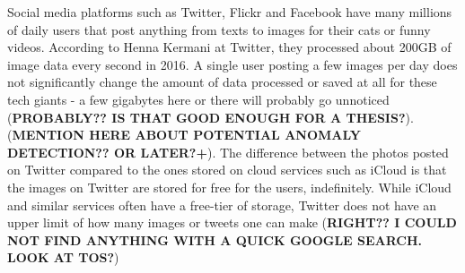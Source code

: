 Social media platforms such as Twitter, Flickr and Facebook have many millions of daily users that post anything from texts to images for their cats or funny videos. According to Henna Kermani at Twitter, they processed about 200GB of image data every second in 2016\cite{MobileScaleLondona}. A single user posting a few images per day does not significantly change the amount of data processed or saved at all for these tech giants - a few gigabytes here or there will probably go unnoticed (\textbf{PROBABLY?? IS THAT GOOD ENOUGH FOR A THESIS?}). (\textbf{MENTION HERE ABOUT POTENTIAL ANOMALY DETECTION?? OR LATER?+}). The difference between the photos posted on Twitter compared to the ones stored on cloud services such as iCloud is that the images on Twitter are stored for free for the users, indefinitely. While iCloud and similar services often have a free-tier of storage, Twitter does not have an upper limit of how many images or tweets one can make (\textbf{RIGHT?? I COULD NOT FIND ANYTHING WITH A QUICK GOOGLE SEARCH. LOOK AT TOS?})
